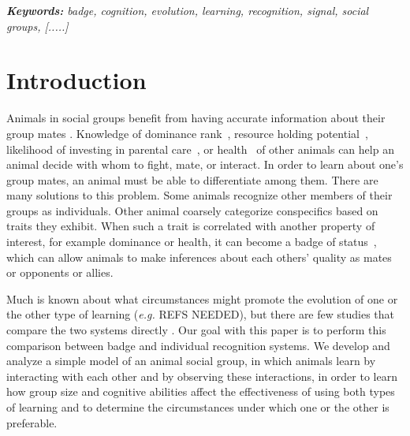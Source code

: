 \textit{\textbf{Keywords:} badge, cognition, evolution, learning, recognition, signal, social groups,  [.....]}

\newpage
\section*{Introduction} 
Animals in social groups benefit from having accurate information about their group mates \cite{Seyfarth:2010bh}. Knowledge of dominance rank~\cite{Hobson:2015kx,Hobson:2015uq,Flack:2006fk,Brush:2013fk,Flack:2006uq,Cowlishaw:1990vn,Waal:1986ys,Seyfarth:2005ve,Bergman:2003qf}, resource holding potential~\cite{Arnott:2009zr,Lemel:1993ve,Dick:1990cr,Rhijn:1980uq,Freeman:1985kl}, likelihood of investing in parental care~\cite{Olsen:2010uq,Qvarnstrom:1997fk}, or health~\cite{Folstad:1992kx,Loyau:2005nx} of other animals can help an animal decide with whom to fight, mate, or interact. In order to learn about one's group mates, an animal must be able to differentiate among them. There are many solutions to this problem. Some animals recognize other members of their groups as individuals. Other animal coarsely categorize conspecifics based on traits they exhibit. When such a trait is correlated with another property of interest, for example dominance or health, it can become a badge of status~\cite{dawkins1978signals,Rohwer:1981vn,Rohwer:1982fk}, which can allow animals to make inferences about each others' quality as mates or opponents or allies. 

Much is known about what circumstances might promote the evolution of one or the other type of learning (\textit{e.g. }REFS NEEDED), but there are few studies that compare the two systems directly \cite{sheehan2016evotradeoff}. Our goal with this paper is to perform this comparison between badge and individual recognition systems. We develop and analyze a simple model of an animal social group, in which animals learn by interacting with each other and by observing these interactions, in order to learn how group size and cognitive abilities affect the effectiveness of using both types of learning and to determine the circumstances under which one or the other is preferable. 

